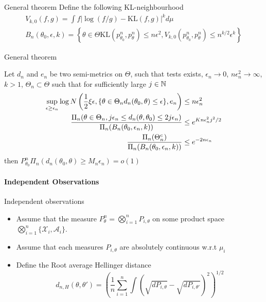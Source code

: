 {General theorem}
Define the following KL-neighbourhood 
\begin{align*}
V_{k,0}(f,g) = \int f|\log(f/g) - \text{KL}(f,g)|^k d\mu \\ 
B_n(\theta_0,\epsilon,k) = \left\{ \theta \in \Theta \text{KL}(p^n_{\theta_0},p^n_\theta)\leq n\epsilon^2, V_{k,0}(p_{\theta_0}^n, p^n_\theta) \leq n^{k/2}\epsilon^k \right\}
\end{align*}






{General theorem}
\begin{theorem}
Let $d_n$ and $e_n$ be two semi-metrics on $\Theta$, such that tests exists, $\epsilon_n\to 0 $, $n\epsilon_n^2 \to \infty$, $k>1$, $\Theta_n \subset \Theta$ such that for sufficiently large $j\in \mathbb{N}$ 
\begin{align*}
\sup_{\epsilon \geq \epsilon_n} \log N\left( \frac{1}{2} \xi \epsilon, \{\theta \in \Theta_n d_n(\theta_0,\theta)\leq \epsilon \}, e_n  \right) &\leq n\epsilon_n^2\\ 
{\Pi_n(\theta \in \Theta_n, j\epsilon_n \leq d_n(\theta,\theta_0)\leq 2j\epsilon_n) \over \Pi_n(B_n(\theta_0,\epsilon_n,k))} &\leq e^{Kn\epsilon_n^2j^2/2}\\ 
{\Pi_n(\Theta_n^c) \over \Pi_n(B_n(\theta_0,\epsilon_n,k))} & \leq e^{-2n\epsilon_n}
\end{align*}
then $P_{\theta_0}^n \Pi_n(d_n(\theta_0,\theta)\geq M_n \epsilon_n) = o(1)$
\end{theorem}




\paragraph{Independent Observations}



{Independent observations}

\begin{itemize}
\item Assume that the measure $P_\theta^n = \bigotimes_{i=1}^{n} P_{i,\theta}$ on some product space $\bigotimes_{i=1}^n \{\mathcal{X}_i, \mathcal{A}_i\}$. 
\item Assume that each measures $P_{i,\theta}$ are absolutely continuous w.r.t $\mu_i$ 
\item Define the Root average Hellinger distance 
$$
d_{n,H} (\theta, \theta') = \left( \frac{1}{n} \sum_{i=1}^n \int (\sqrt{dP_{i,\theta}} - \sqrt{dP_{i,\theta'}})^2 \right)^{1/2}
$$
\end{itemize}

